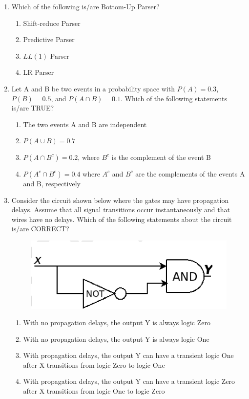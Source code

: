 \documentclass[a4paper, 11pt]{article}
\begin{document}
\begin{enumerate}
    \item Which of the following is/are Bottom-Up Parser?
    \begin{enumerate}
        \item Shift-reduce Parser
        \item Predictive Parser
        \item $LL(1)$ Parser
        \item LR Parser
    \end{enumerate}
    \hfill{}

    \item Let A and B be two events in a probability space with $P(A) = 0.3$, $P(B) = 0.5$, and $P(A \cap B) = 0.1$. Which of the following statements is/are TRUE?
    \begin{enumerate}
        \item The two events A and B are independent
        \item $P(A \cup B) = 0.7$
        \item $P(A \cap B^c) = 0.2$, where $B^c$ is the complement of the event B
        \item $P(A^c \cap B^c) = 0.4$ where $A^c$ and $B^c$ are the complements of the events A and B, respectively
    \end{enumerate}
    \hfill{}

    \item Consider the circuit shown below where the gates may have propagation delays. Assume that all signal transitions occur instantaneously and that wires have no delays. Which of the following statements about the circuit is/are CORRECT?

    \begin{figure}[H]
        \centering
        \includegraphics[width=0.5\columnwidth]{figs/q28.png}
        \caption*{}
        \label{fig:q28}
    \end{figure}

    \begin{enumerate}
        \item With no propagation delays, the output Y is always logic Zero
        \item With no propagation delays, the output Y is always logic One
        \item With propagation delays, the output Y can have a transient logic One after X transitions from logic Zero to logic One
        \item With propagation delays, the output Y can have a transient logic Zero after X transitions from logic One to logic Zero
    \end{enumerate}
    \hfill{}


\end{enumerate}
\end{document}
